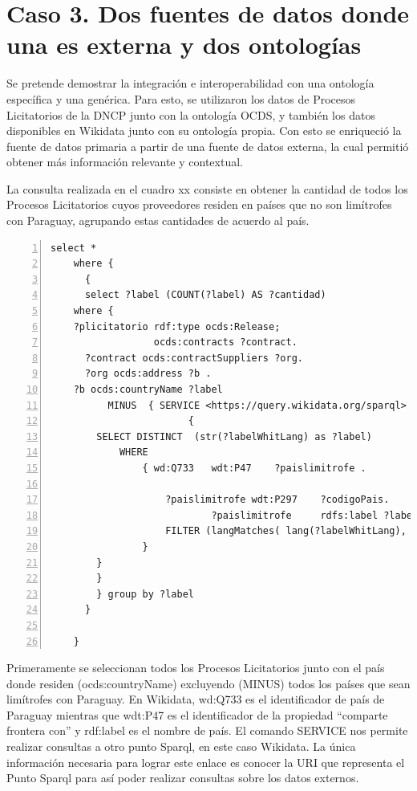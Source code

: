 \section{Caso 3. Dos fuentes de datos donde una es externa y dos ontologías}

Se pretende demostrar la integración e interoperabilidad con una ontología específica y una genérica. Para esto, se utilizaron los datos de Procesos Licitatorios de la DNCP junto con la ontología OCDS, y también los datos disponibles en Wikidata junto con su ontología propia. Con esto se enriqueció la fuente de datos primaria a partir de una fuente de datos externa, la cual permitió obtener más información relevante y contextual.

La consulta realizada en el cuadro xx consiste en obtener la cantidad de todos los Procesos Licitatorios cuyos proveedores residen en países que no son limítrofes con Paraguay, agrupando estas cantidades de acuerdo al país.


\begin{lstlisting}[captionpos=b, caption=Información referente al proceso licitatorio cuyo identificacor es, label=lst:caso2-3,  numbers=left,  numberstyle=\tiny\color{mygray},
    basicstyle=\ttfamily,frame=single]
select *
    where {
      {
      select ?label (COUNT(?label) AS ?cantidad)
    where {
    ?plicitatorio rdf:type ocds:Release;
                  ocds:contracts ?contract.
      ?contract ocds:contractSuppliers ?org.
      ?org ocds:address ?b .
    ?b ocds:countryName ?label
          MINUS  { SERVICE <https://query.wikidata.org/sparql>
                        { 
        SELECT DISTINCT  (str(?labelWhitLang) as ?label)
            WHERE
                { wd:Q733   wdt:P47    ?paislimitrofe .
                
                    ?paislimitrofe wdt:P297    ?codigoPais.
                            ?paislimitrofe     rdfs:label ?labelWhitLang. 
                    FILTER (langMatches( lang(?labelWhitLang), "ES" ) )
                }        
        }
        }
        } group by ?label
      }
    
    }
 \end{lstlisting}

 Primeramente se seleccionan todos los Procesos Licitatorios junto con el país donde residen (ocds:countryName) excluyendo (MINUS) todos los países que sean limítrofes con Paraguay. En Wikidata, wd:Q733 es el identificador de país de Paraguay mientras que wdt:P47 es el identificador de la propiedad “comparte frontera con” y rdf:label es el nombre de país. El comando SERVICE nos permite realizar consultas a otro punto Sparql, en este caso Wikidata. La única información necesaria para lograr este enlace es conocer la URI que representa el Punto Sparql para así poder realizar consultas sobre los datos externos.


